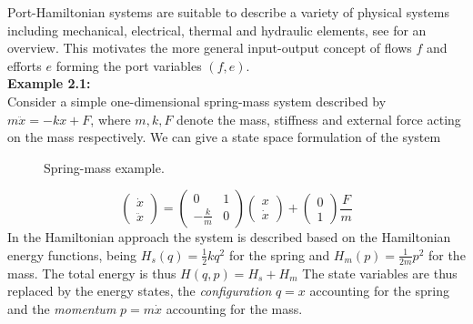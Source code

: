 \documentclass[a4paper,twoside, openright,12pt]{report}
\begin{document}
Port-Hamiltonian systems are suitable to describe a variety of physical systems including mechanical, electrical, thermal and hydraulic elements, see \cite{duindam2009geoplexbook} for an overview. This motivates the more general input-output concept of flows $f$ and efforts $e$ forming the port variables $(f,e)$.\\
\textbf{Example 2.1:}\\
Consider a simple one-dimensional spring-mass system described by $ m\ddot{x} = -kx +F $, where $ m,k,F $ denote the mass, stiffness and external force acting on the mass respectively. We can give a state space formulation of the system
\begin{figure}[b!]
	\centering
	\sf\small
	\def\svgwidth{0.5\columnwidth}
	
	\caption{Spring-mass example.}
	\label{FIG:springmass}
\end{figure}
\begin{equation}
	\begin{pmatrix}\dot{x} \\ \ddot{x}\end{pmatrix} =
	\begin{pmatrix}0 & 1 \\ -\frac{k}{m} & 0\end{pmatrix}
	\begin{pmatrix}x \\ \dot{x}\end{pmatrix} + 
	\begin{pmatrix}0 \\ 1\end{pmatrix}\frac{F}{m}
\end{equation}
In the Hamiltonian approach the system is described based on the Hamiltonian energy functions, being $ H_s(q) = \frac{1}{2}kq^2 $ for the spring and $ H_m(p) = \frac{1}{2m}p^2 $ for the mass. The total energy is thus $H(q,p) = H_s + H_m$ The state variables are thus replaced by the energy states, the \emph{configuration} $q=x$ accounting for the spring and the \emph{momentum} $p=m\dot{x}$ accounting for the mass.  
\end{document}
